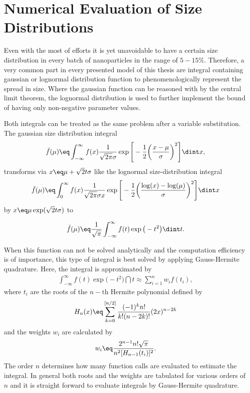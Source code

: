 \documentclass[\main/dresen_thesis.tex]{subfiles}
\begin{document}
\section{Numerical Evaluation of Size Distributions}\label{ch:appendix:numericalMethods:sizeDistributions}
Even with the most of efforts it is yet unavoidable to have a certain size distribution in every batch of nanoparticles in the range of $5 - 15 \%$.
Therefore, a very common part in every presented model of this thesis are integral containing gaussian or lognormal distribution function to phenomenologically represent the spread in size. Where the gaussian function can be reasoned with by the central limit theorem, the lognormal distribution is used to further implement the bound of having only non-negative parameter values.

Both integrals can be treated as the same problem after a variable substitution. 
The gaussian size distribution integral
\begin{align}
\bar{f}(\mu) \eq \int_{-\infty}^\infty f(x) \frac{1}{\sqrt{2\pi} \sigma} \exp \Bigg[- \frac{1}{2} \bigg(\frac{x-\mu}{\sigma}\bigg)^2 \Bigg] \dint x,
\end{align}
transforms via $x \eq \mu + \sqrt{2} t \sigma$ like the lognormal size-distribution integral
\begin{align}
\bar{f}(\mu) \eq \int_{0}^\infty f(x) \frac{1}{\sqrt{2\pi} \sigma x} \exp \Bigg[- \frac{1}{2} \bigg(\frac{\log(x)-\log(\mu)}{\sigma}\bigg)^2 \Bigg] \dint x
\end{align}
by $x \eq \mu \exp(\sqrt{2} t \sigma)$ to

\begin{align}
\bar{f}(\mu) \eq \frac{1}{\sqrt{\pi}} \int_{-\infty}^\infty f(t) \exp \big(- t^2 \big) \dint t.
\end{align}

When this function can not be solved analytically and the computation efficiency is of importance, this type of integral is best solved by applying Gauss-Hermite quadrature. Here, the integral is approximated by
\begin{align}
\int_{-\infty}^\infty f(t) \exp \big(- t^2 \big) \dint t \approx \sum_{i=1}^{n} w_i f(t_i),
\end{align}
where $t_{i}$ are the roots of the $n-\mathrm{th}$ Hermite polynomial defined by
\begin{align}
H_n (x) \eq \sum_{k=0}^{[n/2]} \frac{(-1)^k n!}{k! (n-2k)!} (2x)^{n-2k}
\end{align}
and the weights $w_{i}$ are calculated by
\begin{align}
w_i \eq \frac{2^{n-1} n! \sqrt{\pi}}{n^2 [H_{n-1}(t_i)]^2}.
\end{align}
The order $n$ determines how many function calls are evaluated to estimate the integral. 
In general both roots and the weights are tabulated for various orders of $n$ and it is straight forward to evaluate integrals by Gauss-Hermite quadrature. 
\end{document}
